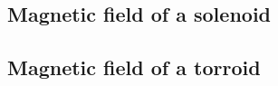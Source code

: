 \documentclass{ximera}
\begin{document}
\begin{example}
\subsection{Magnetic field of a solenoid}





\end{example}


\begin{example}
\subsection{Magnetic field of a torroid}

\end{example}
\end{document}
